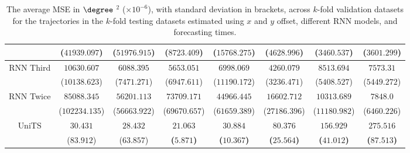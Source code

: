 \begin{table}[!ht]
{\begin{tabular}{|c|c|c|c|c|c|c|c|}
			 & ($41939.097$) & ($51976.915$) & ($8723.409$) & ($15768.275$) & ($4628.996$) & ($3460.537$) & ($3601.299$) \\ \hline
			\multirow{2}{*}{RNN Third} & $10630.607$ & $6088.395$ & $5653.051$ & $6998.069$ & $4260.079$ & $8513.694$ & $7573.31$ \\
			 & ($10138.623$) & ($7471.271$) & ($6947.611$) & ($11190.172$) & ($3236.471$) & ($5408.527$) & ($5449.272$) \\ \hline
			\multirow{2}{*}{RNN Twice} & $85088.345$ & $56201.113$ & $73709.171$ & $44966.445$ & $16602.712$ & $10313.689$ & $7848.0$ \\
			 & ($102234.135$) & ($56663.922$) & ($69670.657$) & ($61659.389$) & ($27186.396$) & ($11180.982$) & ($6460.226$) \\ \hline
			\multirow{2}{*}{UniTS} & $30.431$ & $28.432$ & $\mathbf{21.063}$ & $\mathbf{30.884}$ & $\mathbf{80.376}$ & $\mathbf{156.929}$ & $\mathbf{275.516}$ \\
			 & ($83.912$) & ($63.857$) & \textbf{(}$\mathbf{5.871}$\textbf{)} & \textbf{(}$\mathbf{10.367}$\textbf{)} & \textbf{(}$\mathbf{25.564}$\textbf{)} & \textbf{(}$\mathbf{41.012}$\textbf{)} & \textbf{(}$\mathbf{87.513}$\textbf{)} \\ \hline
		\end{tabular}
	}
	\caption{The average MSE in $\degree$ $^{2}$ ($\times 10^{-6}$), with standard deviation in brackets, across $k$-fold validation datasets for the trajectories in the $k$-fold testing datasets estimated using $x$ and $y$ offset, different RNN models, and forecasting times.}
	\label{tab:all_no_abs_MSE}
\end{table}

